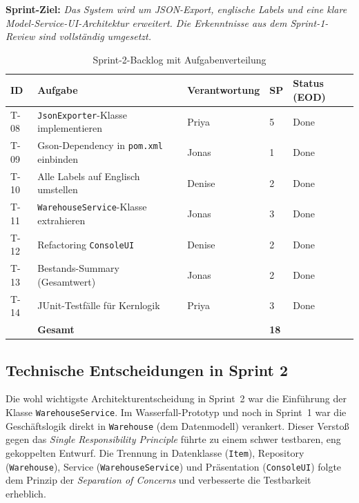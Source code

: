\documentclass[12pt, a4paper, twoside]{report}
\newcommand{\cmark}{\textcolor{darkGreen}{\ding{51}}}
\begin{document}
\textbf{Sprint-Ziel:} \textit{Das System wird um JSON-Export, englische Labels und eine
klare Model-Service-UI-Architektur erweitert. Die Erkenntnisse aus dem Sprint-1-Review
sind vollständig umgesetzt.}

\begin{table}[H]
  \centering
  \caption{Sprint-2-Backlog mit Aufgabenverteilung}
  \label{tab:sprint2}
  \begin{tabularx}{\textwidth}{C{0.7cm} L{4.5cm} L{3.5cm} C{1.5cm} C{2.5cm}}
    \toprule
    \textbf{ID} & \textbf{Aufgabe} & \textbf{Verantwortung} & \textbf{SP} & \textbf{Status (EOD)} \\
    \midrule
    T-08 & \texttt{JsonExporter}-Klasse implementieren   & Priya  & 5 & \cmark{} Done \\
    T-09 & Gson-Dependency in \texttt{pom.xml} einbinden & Jonas  & 1 & \cmark{} Done \\
    T-10 & Alle Labels auf Englisch umstellen            & Denise & 2 & \cmark{} Done \\
    T-11 & \texttt{WarehouseService}-Klasse extrahieren  & Jonas  & 3 & \cmark{} Done \\
    T-12 & Refactoring \texttt{ConsoleUI}                & Denise & 2 & \cmark{} Done \\
    T-13 & Bestands-Summary (Gesamtwert)                 & Jonas  & 2 & \cmark{} Done \\
    T-14 & JUnit-Testfälle für Kernlogik                 & Priya  & 3 & \cmark{} Done \\
    \midrule
    & \textbf{Gesamt}                                    &        & \textbf{18} & \\
    \bottomrule
  \end{tabularx}
\end{table}

\subsection{Technische Entscheidungen in Sprint 2}

Die wohl wichtigste Architekturentscheidung in Sprint~2 war die Einführung der Klasse
\texttt{WarehouseService}. Im Wasserfall-Prototyp und noch in Sprint~1 war die
Geschäftslogik direkt in \texttt{Warehouse} (dem Datenmodell) verankert. Dieser Verstoß
gegen das \textit{Single Responsibility Principle} führte zu einem schwer testbaren,
eng gekoppelten Entwurf. Die Trennung in Datenklasse (\texttt{Item}), Repository
(\texttt{Warehouse}), Service (\texttt{WarehouseService}) und Präsentation
(\texttt{ConsoleUI}) folgte dem Prinzip der \textit{Separation of Concerns} und verbesserte
die Testbarkeit erheblich.
\end{document}
